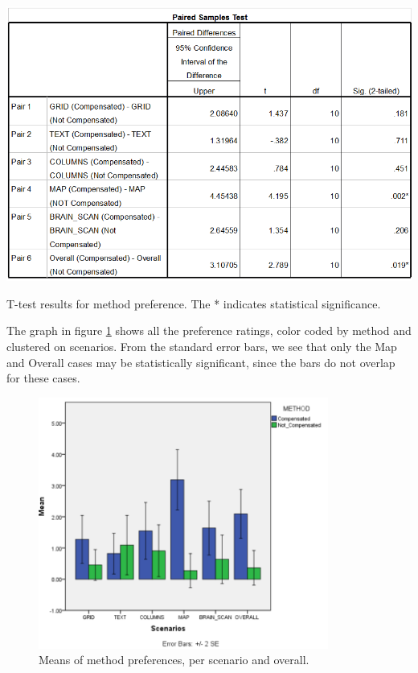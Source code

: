\documentclass[]{article}
\begin{document}
\begin{table}[!h]
  \includegraphics[width=\linewidth]{figures/results/Preference_Test.PNG}
  \caption{T-test results for method preference. The * indicates statistical significance.}
   \label{tabel:Preference_Test}
\end{table}

The graph in figure \ref{fig:Preference_Graph} shows all the preference ratings, color coded by method and clustered on scenarios. From the standard error bars, we see that only the Map and Overall cases may be statistically significant, since the bars do not overlap for these cases.

\begin{figure}[!h]
    \centering
    \includegraphics[width=0.85\textwidth]{figures/results/Preference_Graph.PNG}
    \caption{Means of method preferences, per scenario and overall.}
    \label{fig:Preference_Graph}
\end{figure}
\end{document}
